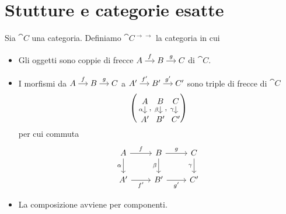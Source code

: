 \section{Stutture e categorie esatte}

\begin{recall}
  Sia \(\cat C\) una categoria. Definiamo \(\cat C^{\to\to}\) la
  categoria in cui
  \begin{itemize}
  \item Gli oggetti sono coppie di frecce
    \(\begin{tikzcd}[column sep=small, cramped] A \ar["{f}", r] & B
      \ar["{g}", r] & C \end{tikzcd}\) di \(\cat C\).
  \item I morfismi da
    \(\begin{tikzcd}[column sep=small, cramped] A \ar["{f}", r] & B
      \ar["{g}", r] & C \end{tikzcd}\) a
    \(\begin{tikzcd}[column sep=small, cramped] A' \ar["{f'}", r] & B'
      \ar["{g'}", r] & C' \end{tikzcd}\) sono triple di frecce di
    \(\cat C\)
    \[
      \left(
        \begin{tikzcd}[row sep=small, cramped] A \ar["{\alpha}", d, swap] \\
          A' \end{tikzcd},
        \begin{tikzcd}[row sep=small, cramped] B \ar["{\beta}", d, swap] \\
          B' \end{tikzcd},
        \begin{tikzcd}[row sep=small, cramped] C \ar["{\gamma}", d, swap] \\
          C' \end{tikzcd} \right)
    \]
    per cui commuta
    \[
      \begin{tikzcd}
        A \ar["{f}", r] \ar["{\alpha}", d, swap] & B \ar["{g}", r] \ar["{\beta}",
        d, swap] & C \ar["{\gamma}", d, swap] \\
        A' \ar["{f'}", r, swap] & B' \ar["{g'}", r, swap] & C'
      \end{tikzcd}
    \]
  \item La composizione avviene per componenti.
  \end{itemize}
\end{recall}

